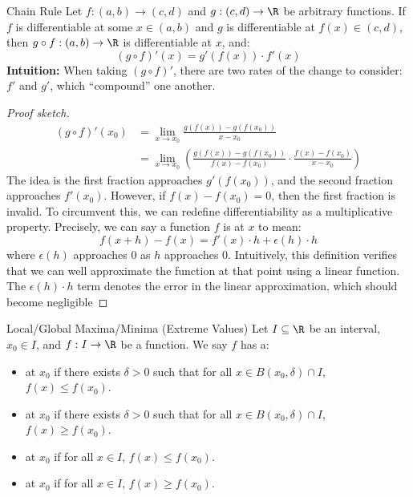 \begin{thmbox}{Chain Rule}{}
    Let $f : (a,b) \to (c,d)$ and $g : (c,d) \to \R$ be arbitrary functions. If $f$ is differentiable at some $x \in (a,b)$ and $g$ is differentiable at $f(x) \in (c,d)$, then $g \circ f : (a,b) \to \R$ is differentiable at $x$, and:
    \[ ( g \circ f )\prime (x) = g\prime(f(x)) \cdot f\prime(x) \]
    \tcblower
    \textbf{Intuition:} When taking $( g \circ f )\prime$, there are two rates of the change to consider: $f\prime$ and $g\prime$, which ``compound'' one another.
    \begin{proof}[Proof sketch]
        \begin{align*}
            (g \circ f)\prime(x_0)
            &= \lim_{x \to x_0} \frac{g(f(x)) - g(f(x_0))}{x - x_0} \\
            &= \lim_{x \to x_0} \left( \frac{g(f(x)) - g(f(x_0))}{f(x) - f(x_0)} \cdot \frac{f(x) - f(x_0)}{x - x_0} \right)
        \end{align*}
        The idea is the first fraction approaches $g\prime(f(x_0))$, and the second fraction approaches $f\prime(x_0)$. However, if $f(x) - f(x_0) = 0$, then the first fraction is invalid. To circumvent this, we can redefine differentiability as a multiplicative property. Precisely, we can say a function $f$ is  at $x$ to mean:
        \[ f(x+h) - f(x) = f\prime(x) \cdot h + \epsilon(h) \cdot h \]
        where $\epsilon(h)$ approaches $0$ as $h$ approaches $0$. Intuitively, this definition verifies that we can well approximate the function at that point using a linear function. The $\epsilon(h) \cdot h$ term denotes the error in the linear approximation, which should become negligible
    \end{proof}
\end{thmbox}

\begin{dfnbox}{Local/Global Maxima/Minima (Extreme Values)}{}
    Let $I \subseteq \R$ be an interval, $x_0 \in I$, and $f : I \to \R$ be a function. We say $f$ has a:
    \begin{itemize}
        \item {} at $x_0$ if there exists $\delta > 0$ such that for all $x \in B(x_0, \delta) \cap I$, $f(x) \leq f(x_0)$.
        \item {} at $x_0$ if there exists $\delta > 0$ such that for all $x \in B(x_0, \delta) \cap I$, $f(x) \geq f(x_0)$.
        \item {} at $x_0$ if for all $x \in I$, $f(x) \leq f(x_0)$.
        \item {} at $x_0$ if for all $x \in I$, $f(x) \geq f(x_0)$.
    \end{itemize}
\end{dfnbox}

